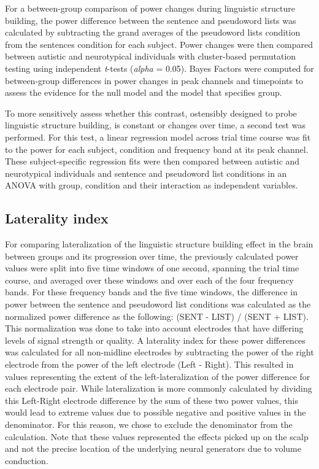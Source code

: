 For a between-group comparison of power changes during linguistic structure building, the power difference between the sentence and pseudoword lists was calculated by subtracting the grand averages of the pseudoword lists condition from the sentences condition for each subject. Power changes were then compared between autistic and neurotypical individuals with cluster-based permutation testing using independent \textit{t}-tests (\textit{alpha} = 0.05). Bayes Factors were computed for between-group differences in power changes in peak channels and timepoints to assess the evidence for the null model and the model that specifies group.

To more sensitively assess whether this contrast, ostensibly designed to probe linguistic structure building, is constant or changes over time, a second test was performed.  For this test, a linear regression model across trial time course was fit to the power for each subject, condition and frequency band at its peak channel. These subject-specific regression fits were then compared between autistic and neurotypical individuals and sentence and pseudoword list conditions in an ANOVA with group, condition and their interaction as independent variables. 

\subsection{Laterality index}

For comparing lateralization of the linguistic structure building effect in the brain between groups and its progression over time, the previously calculated power values were split into five time windows of one second, spanning the trial time course, and averaged over these windows and over each of the four frequency bands. For these frequency bands and the five time windows, the difference in power between the sentence and pseudoword list conditions was calculated as the normalized power difference as the following: (SENT - LIST) / (SENT + LIST). This normalization was done to take into account electrodes that have differing levels of signal strength or quality. A laterality index for these power differences was calculated for all non-midline electrodes by subtracting the power of the right electrode from the power of the left electrode (Left - Right). This resulted in values representing the extent of the left-lateralization of the power difference for each electrode pair. While lateralization is more commonly calculated by dividing this Left-Right electrode difference by the sum of these two power values, this would lead to extreme values due to possible negative and positive values in the denominator. For this reason, we chose to exclude the denominator from the calculation. Note that these values represented the effects picked up on the scalp and not the precise location of the underlying neural generators due to volume conduction.


